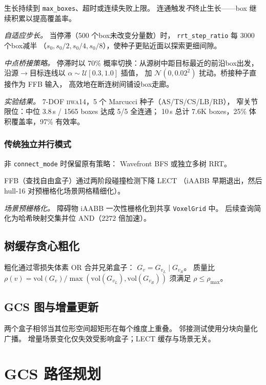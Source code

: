 \documentclass[journal]{IEEEtran}
\begin{document}
生长持续到 \texttt{max\_boxes}、超时或连续失败上限。
连通触发\emph{不}终止生长——box 继续积累以提高覆盖率。

\emph{自适应步长。}
当停滞（500 个box未改变分量数）时，
\texttt{rrt\_step\_ratio} 每 3000 个box减半
（$s_0, s_0/2, s_0/4, s_0/8$），使种子更贴近面以探索更细间隙。

\emph{中点桥接策略。}
停滞时以 70\% 概率切换：从源树中距目标最近的前沿box出发，
沿源$\to$目标连线以 $\alpha \sim \mathcal{U}[0.3, 1.0]$ 插值，
加 $\mathcal{N}(0, 0.02^2)$ 扰动。桥接种子直接作为 FFB 输入，
高效地在断连树间铺设box走廊。

\emph{实验结果。}
7-DOF \textsc{iiwa14}，5 个 Marcucci 种子（AS/TS/CS/LB/RB），
窄关节限位：中位 3.8\,s / 1565 boxes 达成 5/5 全连通；
10\,s 总计 7.6K boxes，25\% 体积覆盖率，97\% 有效率。

\subsubsection{传统独立并行模式}

非 \texttt{connect\_mode} 时保留原有策略：
Wavefront BFS 或独立多树 RRT。

FFB（查找自由盒子）通过两阶段碰撞检测下降 LECT
（iAABB 早期退出，然后 hull-16 对预栅格化场景网格精细化）。

\emph{场景预栅格化。}
障碍物 iAABB 一次性栅格化到共享 \texttt{VoxelGrid} 中。
后续查询简化为哈希映射交集并位 AND（$2272$ 倍加速）。

\subsection{树缓存贪心粗化}\label{sec:coarsen}

粗化通过零损失体素 OR 合并兄弟盒子：
$G_{v} = G_{v_L} \mathbin{|} G_{v_R}$。
质量比
$\rho(v) = \mathrm{vol}(G_v) / \max(\mathrm{vol}(G_{v_L}), \mathrm{vol}(G_{v_R}))$
须满足 $\rho \leq \rho_\text{max}$。

\subsection{GCS 图与增量更新}\label{sec:gcs_graph}

两个盒子相邻当其位形空间超矩形在每个维度上重叠。
邻接测试使用分块向量化广播。
增量场景变化仅失效受影响盒子；LECT 缓存与场景无关。

\section{GCS 路径规划}\label{sec:planner}
\end{document}
